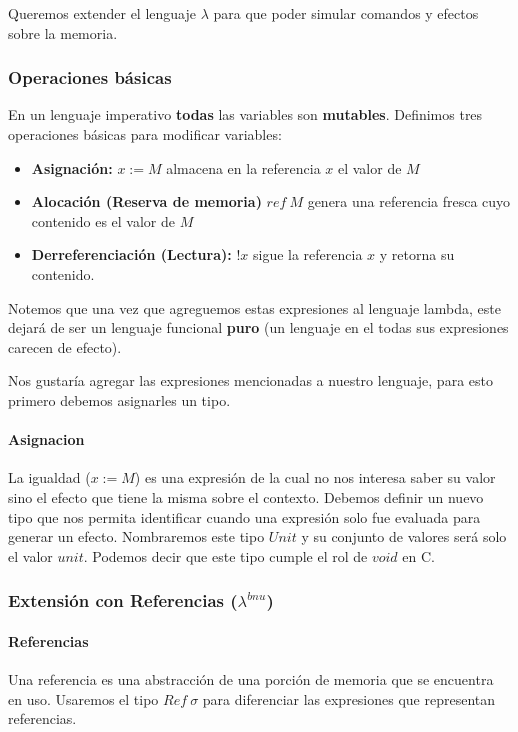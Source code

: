 Queremos extender el lenguaje $\lambda$ para que poder simular comandos y efectos sobre la memoria.

\subsubsection{Operaciones básicas}
En un lenguaje imperativo \textbf{todas} las variables son \textbf{mutables}. Definimos tres operaciones básicas para modificar variables:

\begin{itemize}
	\item \textbf{Asignación:} $x := M$ almacena en la referencia $x$ el valor de $M$
	\item \textbf{Alocación (Reserva de memoria)} $ref~M$ genera una referencia fresca cuyo contenido es el valor de $M$
	\item \textbf{Derreferenciación (Lectura):} $!x$ sigue la referencia $x$ y retorna su contenido.
\end{itemize}


Notemos que una vez que agreguemos estas expresiones al lenguaje lambda, este dejará de ser un lenguaje funcional \textbf{puro} (un lenguaje en el todas sus expresiones carecen de efecto).

Nos gustaría agregar las expresiones mencionadas a nuestro lenguaje, para esto primero debemos asignarles un tipo. 

\paragraph{Asignacion} La igualdad ($x := M$) es una expresión de la cual no nos interesa saber su valor sino el efecto que tiene la misma sobre el contexto. Debemos definir un nuevo tipo que nos permita identificar cuando una expresión solo fue evaluada para generar un efecto. Nombraremos este tipo $Unit$ y su conjunto de valores será solo el valor $unit$. Podemos decir que este tipo cumple el rol de $void$ en C.

\subsubsection{Extensión con Referencias (\texorpdfstring{$\lambda^{bnu}$}{lambda bnu})}



\paragraph{Referencias}
Una referencia es una abstracción de una porción de memoria que se encuentra en uso. Usaremos el tipo $Ref~\sigma$ para diferenciar las expresiones que representan referencias. 

